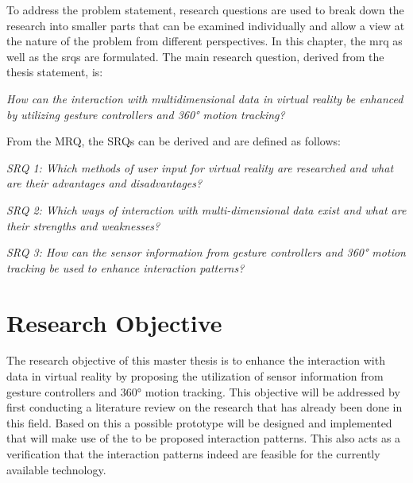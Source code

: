 To address the problem statement, research questions are used to break down the research into smaller parts that can be examined individually and allow a view at the nature of the problem from different perspectives.
In this chapter, the \gls{mrq} as well as the \glspl{srq} are formulated. \newline
The main research question, derived from the thesis statement, is:
\begin{framed}
	\textit{How can the interaction with multidimensional data in virtual reality be enhanced by utilizing gesture controllers and 360° motion tracking?}
\end{framed} \label{MRQ}
From the MRQ, the SRQs can be derived and are defined as follows:
\begin{framed}
	\textit{SRQ 1: Which methods of user input for virtual reality are researched and what are their advantages and disadvantages?}
\end{framed} \label{SRQ1}
\begin{framed}
	\textit{SRQ 2: Which ways of interaction with multi-dimensional data exist and what are their strengths and weaknesses?}
\end{framed} \label{SRQ2}
\begin{framed}
	\textit{SRQ 3: How can the sensor information from gesture controllers and 360° motion tracking be used to enhance  interaction patterns?}
\end{framed} \label{SRQ3}
 


\section{Research Objective}

The research objective of this master thesis is to enhance the interaction with data in virtual reality by proposing the utilization of sensor information from gesture controllers and 360° motion tracking.\newline
This objective will be addressed by first conducting a literature review on the research that has already been done in this field. Based on this a possible prototype will be designed and implemented that will make use of the to be proposed interaction patterns. This also acts as a verification that the interaction patterns indeed are feasible for the currently available technology.


